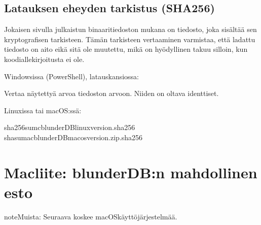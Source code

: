 \documentclass[letterpaper,10pt,finnish]{sphinxmanual}
\begin{document}
\subsection{Latauksen eheyden tarkistus (SHA256)}
\label{\detokenize{annexe_windows_securite:verifier-l-integrite-du-telechargement-sha256}}
\sphinxAtStartPar
Jokaisen \sphinxhyphen{}sivulla julkaistun binaaritiedoston mukana on \sphinxhyphen{}tiedosto, joka sisältää sen kryptografisen tarkisteen. Tämän tarkisteen vertaaminen varmistaa, että ladattu tiedosto on aito eikä sitä ole muutettu, mikä on hyödyllinen takuu silloin, kun koodiallekirjoitusta ei ole.

\sphinxAtStartPar
Windowsissa (PowerShell), latauskansiossa:

\begin{sphinxVerbatim}[commandchars=\\\{\}]
   
\end{sphinxVerbatim}

\sphinxAtStartPar
Vertaa näytettyä arvoa tiedoston  arvoon. Niiden on oltava identtiset.

\sphinxAtStartPar
Linuxissa tai macOS:ssä:

\begin{sphinxVerbatim}[commandchars=\\\{\}]
sha256sum\PYGZhy{}cblunderDB\PYGZhy{}linux\PYGZhy{}\PYGZlt{}version\PYGZgt{}.sha256
shasum\PYGZhy{}a\PYGZhy{}cblunderDB\PYGZhy{}macos\PYGZhy{}\PYGZlt{}version\PYGZgt{}.zip.sha256
\end{sphinxVerbatim}

\sphinxstepscope


\section{Mac\sphinxhyphen{}liite: blunderDB:n mahdollinen esto}
\label{\detokenize{annexe_mac_securite:annexe-mac-blocage-eventuel-de-blunderdb}}\label{\detokenize{annexe_mac_securite:annexe-mac-malware}}\label{\detokenize{annexe_mac_securite::doc}}
\begin{sphinxadmonition}{note}{Muista:}
\sphinxAtStartPar
Seuraava koskee macOS\sphinxhyphen{}käyttöjärjestelmää.
\end{sphinxadmonition}
\end{document}
